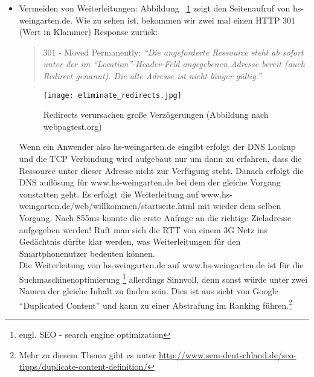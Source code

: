 \begin{itemize}
			\item Vermeiden von Weiterleitungen: Abbildung ~\ref{fig:eliminate_redirects} zeigt den Seitenaufruf von hs-weingarten.de. Wie zu sehen ist, bekommen wir zwei mal einen HTTP 301 (Wert in Klammer) Response zurück: 

			\begin{quote}
				301 - Moved Permanently: \textit{"`Die angeforderte Ressource steht ab sofort unter der im "`Location"'-Header-Feld angegebenen Adresse bereit (auch Redirect genannt). Die alte Adresse ist nicht länger gültig."'} \autocite{wikipediaHTTP}
			\end{quote}

			\begin{figure}[htbp]
				\begin{center}
					\texttt{[image: eliminate\_redirects.jpg]}
					\caption{Redirects verursachen große Verzögerungen (Abbildung nach webpagtest.org)}
					\label{fig:eliminate_redirects}
				\end{center}
			\end{figure}
			
			Wenn ein Anwender also hs-weingarten.de eingibt erfolgt der DNS Lookup und die TCP Verbindung wird aufgebaut nur um dann zu erfahren, dass die Ressource unter dieser Adresse nicht zur Verfügung steht. Danach erfolgt die DNS auflösung für www.hs-weingarten.de bei dem der gleiche Vorgang vonstatten geht. Es erfolgt die Weiterleitung auf www.hs-weingarten.de/web/willkommen/startseite.html mit wieder dem selben Vorgang.	Nach 855ms konnte die erste Anfrage an die richtige Zieladresse aufgegeben werden! Ruft man sich die RTT von einem 3G Netz ins Gedächtnis dürfte klar werden, was Weiterleitungen für den Smartphonenutzer bedeuten können. \\

			Die Weiterleitung von hs-weingarten.de auf www.hs-weingarten.de ist für die Suchmaschinenoptimierung \footnote{engl. SEO - search engine optimization} allerdings Sinnvoll, denn sonst würde unter zwei Namen der gleiche Inhalt zu finden sein. Dies ist aus sicht von Google "`Duplicated Content"' und kann zu einer Abstrafung im Ranking führen.\footnote{Mehr zu diesem Thema gibt es unter \url{http://www.sem-deutschland.de/seo-tipps/duplicate-content-definition/}}

		\end{itemize}

	\pagebreak



